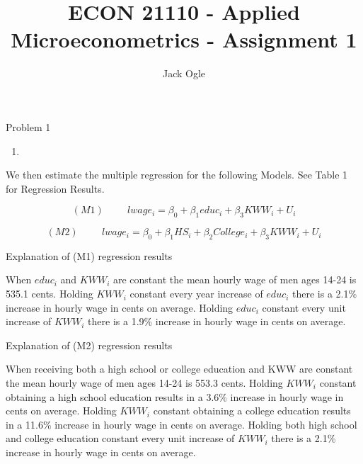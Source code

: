 \documentclass[
  12pt,
  landscape]{article}
\title{ECON 21110 - Applied Microeconometrics - Assignment 1}
\author{Jack Ogle}
\date{}
\begin{document}
\maketitle

Problem 1

\begin{enumerate}
\def\labelenumi{(\alph{enumi})}
\item
\end{enumerate}

We then estimate the multiple regression for the following Models. See
Table 1 for Regression Results.

\[
(M1) \hspace{1cm} lwage_i = \beta_0 + \beta_1educ_i + \beta_3KWW_i + U_i 
\]

\[
(M2) \hspace{1cm} lwage_i = \beta_0 + \beta_1HS_i + \beta_2College_i + \beta_3KWW_i + U_i
\]

\begin{center} Explanation of (M1) regression results \end{center}

When \({educ_i}\) and \({KWW_i}\) are constant the mean hourly wage of
men ages 14-24 is 535.1 cents. Holding \({KWW_i}\) constant every year
increase of \({educ_i}\) there is a 2.1\% increase in hourly wage in
cents on average. Holding \({educ_i}\) constant every unit increase of
\({KWW_i}\) there is a 1.9\% increase in hourly wage in cents on
average.

\begin{center} Explanation of (M2) regression results \end{center}

When receiving both a high school or college education and KWW are
constant the mean hourly wage of men ages 14-24 is 553.3 cents. Holding
\({KWW_i}\) constant obtaining a high school education results in a
3.6\% increase in hourly wage in cents on average. Holding \({KWW_i}\)
constant obtaining a college education results in a 11.6\% increase in
hourly wage in cents on average. Holding both high school and college
education constant every unit increase of \({KWW_i}\) there is a 2.1\%
increase in hourly wage in cents on average.
\end{document}
